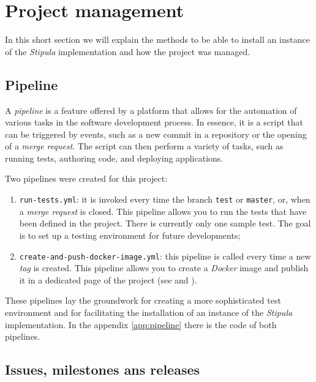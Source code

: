 \section{Project management}

In this short section we will explain the methods to be able to install an instance of the 
\textit{Stipula} implementation and how the project was managed.

\subsection{Pipeline}
\label{pipelines}

A \textit{pipeline} is a feature offered by a platform that allows for the automation of various tasks in 
the software development process. In essence, it is a script that can be triggered by events, such as a 
new commit in a repository or the opening of a \textit{merge request}. The script can then perform a 
variety of tasks, such as running tests, authoring code, and deploying applications.

Two pipelines were created for this project:
\begin{enumerate}
  \item \verb|run-tests.yml|: it is invoked every time the branch \verb|test| or \verb|master|, or, when a 
  \textit{merge request} is closed. This pipeline allows you to run the tests that have been defined in 
  the project. There is currently only one sample test. The goal is to set up a testing environment for 
  future developments;
  \item \verb|create-and-push-docker-image.yml|: this pipeline is called every time a new \textit{tag} is 
  created. This pipeline allows you to create a \textit{Docker} image and publish it in a dedicated page 
  of the project (see \cite{site:stipula-github-packages-page} and 
  \cite{site:stipula-github-available-packages}).
\end{enumerate}

These pipelines lay the groundwork for creating a more sophisticated test environment and for facilitating 
the installation of an instance of the \textit{Stipula} implementation. In the appendix \ref{app:pipeline} 
there is the code of both pipelines.

\subsection{Issues, milestones ans releases}

